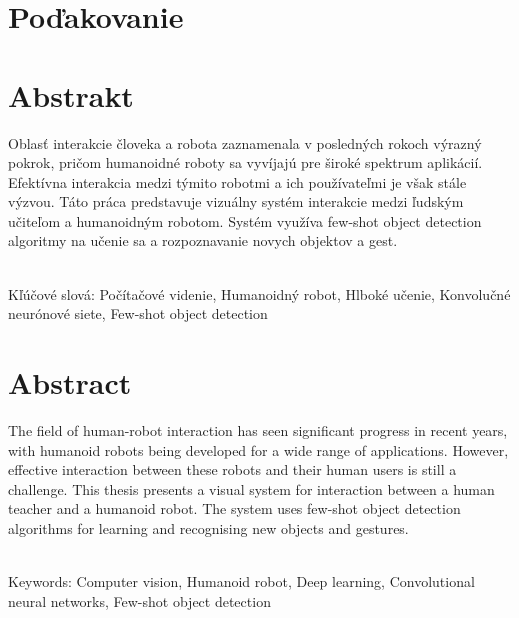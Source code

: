 \documentclass[12pt, a4paper, oneside]{book}
\begin{document}
\chapter*{Poďakovanie}\label{chap:thank_you}

\vfill\eject 

\chapter*{Abstrakt}\label{chap:abstract_sk}

Oblasť interakcie človeka a robota zaznamenala v posledných rokoch výrazný pokrok, pričom humanoidné roboty sa vyvíjajú pre široké spektrum aplikácií. Efektívna interakcia medzi týmito robotmi a ich používateľmi je však stále výzvou. Táto práca predstavuje vizuálny systém interakcie medzi ľudským učiteľom a humanoidným robotom. Systém využíva few-shot object detection algoritmy na učenie sa a rozpoznavanie novych objektov a gest. 

~\\
Kľúčové slová: Počítačové videnie, Humanoidný robot, Hlboké učenie, Konvolučné neurónové siete, Few-shot object detection 
\vfill\eject 

\chapter*{Abstract}\label{chap:abstract_en}

The field of human-robot interaction has seen significant progress in recent years, with humanoid robots being developed for a wide range of applications. However, effective interaction between these robots and their human users is still a challenge. This thesis presents a visual system for interaction between a human teacher and a humanoid robot. The system uses few-shot object detection algorithms for learning and recognising new objects and gestures.

~\\
Keywords: Computer vision, Humanoid robot, Deep learning, Convolutional neural networks, Few-shot object detection 
\vfill\eject 

\tableofcontents

\mainmatter










\backmatter

\nocite{*}



\listoffigures
\end{document}

